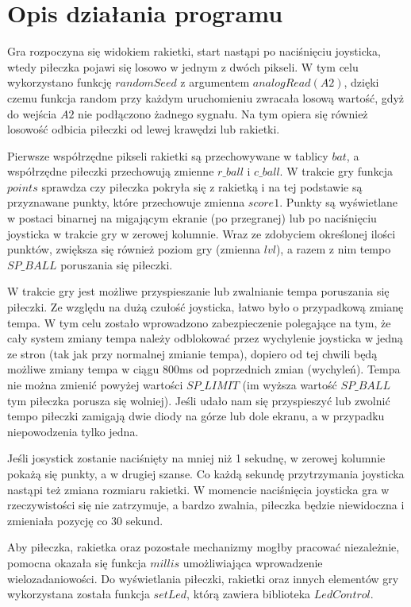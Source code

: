 \documentclass[12pt,notitlepage]{article}
\begin{document}
\section{Opis działania programu}

Gra rozpoczyna się widokiem rakietki, start nastąpi po naciśnięciu joysticka, wtedy piłeczka pojawi się losowo w jednym
z dwóch pikseli. W tym celu wykorzystano funkcję $randomSeed$ z argumentem $analogRead(A2)$, dzięki czemu funkcja random 
przy każdym uruchomieniu zwracała losową wartość, gdyż do wejścia $A2$ nie podłączono żadnego sygnału.
Na tym opiera się również losowość odbicia piłeczki od lewej krawędzi lub rakietki.

Pierwsze współrzędne pikseli rakietki są przechowywane w tablicy $bat$, a współrzędne piłeczki przechowują zmienne $r\_ball$ i $c\_ball$.
W trakcie gry funkcja $points$ sprawdza czy piłeczka pokryła się z rakietką i na tej podstawie są przyznawane punkty, które przechowuje zmienna $score1$.
Punkty są wyświetlane w postaci binarnej na migającym ekranie (po przegranej) lub po naciśnięciu joysticka w trakcie gry w zerowej kolumnie.
Wraz ze zdobyciem określonej ilości punktów, zwiększa się również poziom gry (zmienna $lvl$), a razem z nim tempo $SP\_BALL$ poruszania się piłeczki.

W trakcie gry jest możliwe przyspieszanie lub zwalnianie tempa poruszania się piłeczki. Ze względu na dużą czułość joysticka, łatwo było o
przypadkową zmianę tempa. W tym celu zostało wprowadzono zabezpieczenie polegające na tym, że cały system zmiany tempa należy odblokować
przez wychylenie joysticka w jedną ze stron (tak jak przy normalnej zmianie tempa), dopiero od tej chwili będą możliwe zmiany tempa w ciągu
800ms od poprzednich zmian (wychyleń).
Tempa nie można zmienić powyżej wartości $SP\_LIMIT$ (im wyższa wartość $SP\_BALL$ tym piłeczka porusza się wolniej).
Jeśli udało nam się przyspieszyć lub zwolnić tempo piłeczki zamigają dwie diody na górze lub dole ekranu, a w przypadku niepowodzenia tylko jedna.

Jeśli josystick zostanie naciśnięty na mniej niż 1 sekudnę, w zerowej kolumnie pokażą się punkty, a w drugiej szanse.
Co każdą sekundę przytrzymania joysticka nastąpi też zmiana rozmiaru rakietki. 
W momencie naciśnięcia joysticka gra w rzeczywistości się nie zatrzymuje, a bardzo zwalnia, piłeczka będzie niewidoczna i zmieniała pozycję co 30 sekund.

Aby piłeczka, rakietka oraz pozostałe mechanizmy mogłby pracować niezależnie, pomocna okazała się funkcja $millis$ umożliwiająca wprowadzenie wielozadaniowości.
Do wyświetlania piłeczki, rakietki oraz innych elementów gry wykorzystana została funkcja $setLed$, którą zawiera biblioteka $LedControl$.
\end{document}
